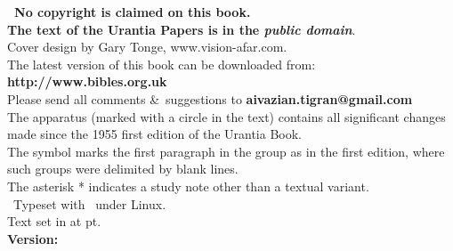 
\newpage
\makeatletter
{}%
\makeatother

\begin{center}
\parbox{0.9\linewidth}{\centering
\textbf{\upshape\nocopyright\ No copyright is claimed on this book.\\
The text of the Urantia Papers is in the \itshape public domain}.\\[5pt]
Cover design by Gary Tonge, www.vision-afar.com.\\
The latest version of this book can be downloaded from:\\
{\upshape\bfseries http://www.bibles.org.uk}\\
Please send all comments \&\ suggestions to {\makeatletter\upshape\bfseries aivazian.tigran@gmail.com\makeatother}\\
The apparatus (marked with a circle in the text) contains all significant changes made since the 1955 first edition of the Urantia Book.\\
The symbol \pc{} marks the first paragraph in the group as in the first edition, where such groups were delimited by blank lines.\\
The asterisk * indicates a study note other than a textual variant.\\[5pt]
\tux\ Typeset with \XeLaTeX\ under Linux.\\
Text set in \textbf{\urantiamainfont} at \urantiamainfontsize pt.\\[18pt]
\upshape\small\bfseries Version: \mytoday{}\\
}
\end{center}

